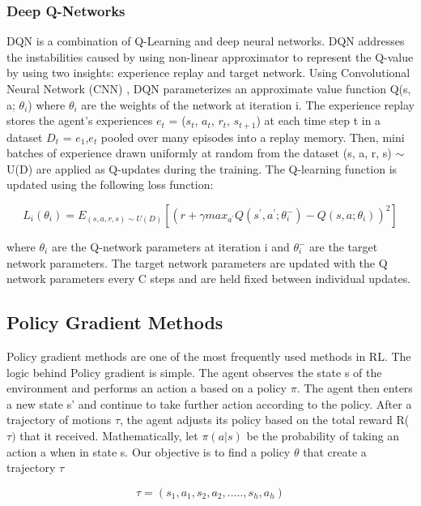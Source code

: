 \documentclass[12pt]{report}
\begin{document}
\subsubsection{Deep Q-Networks} DQN is a combination of Q-Learning and deep neural networks. DQN addresses the instabilities caused by using non-linear approximator to represent the Q-value by using two insights: experience replay and target network. 
Using Convolutional Neural Network (CNN) , DQN parameterizes an approximate value function Q(s, a; $\theta_i$) where $\theta_i$ are the weights of the network at iteration i. The experience replay stores the agent’s experiences $e_t$ = ($s_t$, $a_t$, $r_t$, $s_{t+1}$) at each time step t in a dataset $D_t$ = $e_1$,$e_t$ pooled over many episodes into a replay
memory. Then, mini batches of experience drawn uniformly at random from the dataset (s, a, r, s) $\sim$ U(D) are applied as Q-updates during the training. The Q-learning function is updated using the following loss function:

\begin{equation}\label{q_value_2}
	L_i (\theta_i) = E_{(s,a,r,s) \sim U(D) } [(r +  \gamma max_{a^{'}} Q(s^{'}, a^{'} ; \theta_i^{-}) - Q(s,a; \theta_{i}))^2]
\end{equation}

\hfill \break
where $\theta_i$ are the Q-network parameters at iteration i and $\theta_i^{-}$  are the target network parameters. The target network parameters are updated with the Q network parameters every C steps and are held fixed between individual updates. \\


\subsection{Policy Gradient Methods} Policy gradient methods are one of the most frequently used methods in RL. The logic behind Policy gradient is simple. The agent observes the state s of the environment and performs an action a based on a policy $\pi$. The agent then enters a new state s' and continue to take further action according to the policy. After a trajectory of motions $\tau$, the agent adjusts its policy based on the total reward R($\tau)$ that it received. Mathematically, let $\pi(a|s)$ be the probability of taking an action a when in state s. Our objective is to find a policy $\theta$ that create a trajectory $\tau$ \cite{Sutton}

\[ \tau = (s_1, a_1, s_2, a_2, ....., s_h, a_h ) \]
\end{document}
